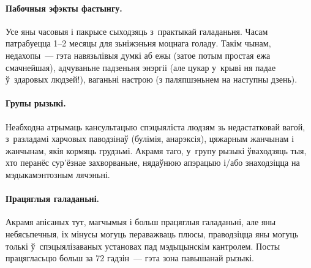 \paragraph{Пабочныя эфэкты фастынгу.}
Усе яны часовыя і пакрысе сыходзяць з~практыкай галаданьня. Часам патрабуецца 1--2 месяцы для зьніжэньня моцнага голаду. Такім чынам, недахопы~--- гэта навязьлівыя думкі аб ежы (затое потым простая ежа смачнейшая), адчуваньне падзеньня энэргіі (але цукар у~крыві ня падае ў~здаровых людзей!), ваганьні настрою (з паляпшэньнем на наступны дзень).

\paragraph{Групы рызыкі.}
Неабходна атрымаць кансультацыю спэцыяліста людзям зь недастатковай вагой, з~разладамі харчовых паводзінаў (булімія, анарэксія), цяжарным жанчынам і жанчынам, якія кормяць грудзьмі. Акрамя таго, у~групу рызыкі ўваходзяць тыя, хто перанёс сур'ёзнае захворваньне, нядаўнюю апэрацыю і/або знаходзіцца на мэдыкамэнтозным лячэньні.


\paragraph{Працяглыя галаданьні.}
Акрамя апісаных тут, магчымыя і больш працяглыя галаданьні, але яны небясьпечныя, іх мінусы могуць пераважваць плюсы, праводзіцца яны могуць толькі ў~спэцыялізаваных установах пад мэдыцынскім кантролем. Посты працягласьцю больш за 72 гадзін~--- гэта зона павышанай рызыкі.